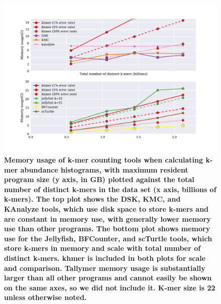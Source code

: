 \documentclass[10pt]{article}
\begin{document}
\begin{figure}[!ht]
\centerline{\includegraphics[width=5in]{./figure/memory_benchmark}}

\caption{\bf Memory usage of k-mer counting tools when calculating
  k-mer abundance histograms, with maximum resident program size (y
  axis, in GB) plotted against the total number of distinct k-mers in
  the data set (x axis, billions of k-mers). The top plot shows the
  DSK, KMC, and KAnalyze tools, which use disk space to store k-mers
  and are constant in memory use, with generally lower memory use than
  other programs.  The bottom plot shows memory use for the Jellyfish,
  BFCounter, and scTurtle tools, which store k-mers in memory and
  scale with total number of distinct k-mers.  khmer is included in
  both plots for scale and comparison. Tallymer memory usage is
  substantially larger than all other programs and cannot easily be
  shown on the same axes, so we did not include it.  K-mer size is 22
  unless otherwise noted.}

\label{fig:cmp_memory}
\end{figure}
\end{document}

